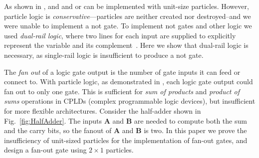 \documentclass[letterpaper, 10 pt, conference]{ieeeconf}
\begin{document}
As shown in \cite{Becker2013f}, {\sc and} and {\sc or} can be implemented with
unit-size particles.  However, particle logic is \emph{conservative}---particles
are neither created nor destroyed--and we were unable to implement a {\sc not}
gate. To implement {\sc not} gates and other logic we used \emph{dual-rail
logic}, where two lines for each input are supplied to explicitly represent the
variable and its complement~\cite{Becker2014a}. Here we show that dual-rail
logic is necessary, as single-rail logic is insufficient to produce a {\sc not}
gate. 

  The \emph{fan out} of a logic gate output is the number of gate inputs it can feed or connect to.  With particle logic, as demonstrated in  \cite{Becker2014}, each logic gate output could fan out to only one gate.  This is sufficient for \emph{sum of products} and \emph{product of sums}  operations in CPLDs (complex programmable logic devices), but insufficient for more flexible architectures.
%  
    Consider the half-adder shown in Fig.~\ref{fig:HalfAdder}.  The inputs $\mathbf{A}$ and  $\mathbf{B}$ are needed to compute both the {\sc sum} and the {\sc carry} bits, so the fanout of $\mathbf{A}$ and  $\mathbf{B}$ is two. In this paper we prove the insufficiency of unit-sized particles for the implementation of fan-out gates, and design a fan-out gate using $2\times 1$ particles. 
  
  



\end{document}
